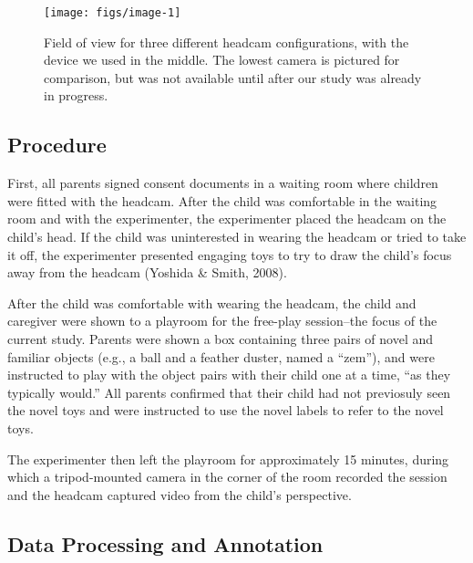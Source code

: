 \documentclass[10pt, letterpaper]{article}
\newenvironment{CodeChunk}{}{}
\begin{document}
\begin{CodeChunk}
\begin{figure}[H]

{\centering \texttt{[image: figs/image-1]} 

}

\caption[Field of view for three different headcam configurations, with the device we used in the middle]{Field of view for three different headcam configurations, with the device we used in the middle. The lowest camera is pictured for comparison, but was not available until after our study was already in progress.}\label{fig:image}
\end{figure}
\end{CodeChunk}

\subsection{Procedure}\label{procedure}

First, all parents signed consent documents in a waiting room where
children were fitted with the headcam. After the child was comfortable
in the waiting room and with the experimenter, the experimenter placed
the headcam on the child's head. If the child was uninterested in
wearing the headcam or tried to take it off, the experimenter presented
engaging toys to try to draw the child's focus away from the headcam
(Yoshida \& Smith, 2008).

After the child was comfortable with wearing the headcam, the child and
caregiver were shown to a playroom for the free-play session--the focus
of the current study. Parents were shown a box containing three pairs of
novel and familiar objects (e.g., a ball and a feather duster, named a
``zem''), and were instructed to play with the object pairs with their
child one at a time, ``as they typically would.'' All parents confirmed
that their child had not previosuly seen the novel toys and were
instructed to use the novel labels to refer to the novel toys.

The experimenter then left the playroom for approximately 15 minutes,
during which a tripod-mounted camera in the corner of the room recorded
the session and the headcam captured video from the child's perspective.

\subsection{Data Processing and
Annotation}\label{data-processing-and-annotation}
\end{document}
